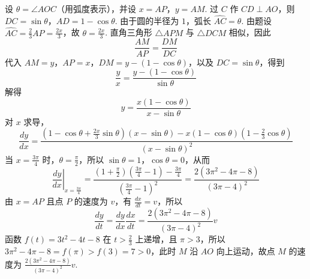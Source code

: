 \begin{solution}
设 \(\theta=\angle AOC\)（用弧度表示），并设 \(x=AP\)，\(y=AM\). 过 \(C\) 作 \(CD\perp AO\)，则 \(DC=\sin\theta\)，\(AD=1-\cos\theta\).
由于圆的半径为 \(1\)，弧长 \(\widehat{AC}=\theta\). 由题设 \(\widehat{AC}=\frac{2}{3}AP=\frac{2x}{3}\)，故 \(\theta=\frac{2x}{3}\).
直角三角形 \(\triangle APM\) 与 \(\triangle DCM\) 相似，因此
\[
\frac{AM}{AP}=\frac{DM}{DC}
\]
代入 \(AM=y\)，\(AP=x\)，\(DM=y-(1-\cos\theta)\)，以及 \(DC=\sin\theta\)，得到
\[
\frac{y}{x}=\frac{y-(1-\cos\theta)}{\sin\theta}
\]
解得
\[
y=\frac{x(1-\cos\theta)}{x-\sin\theta}
\]
对 \(x\) 求导，
\[
\frac{dy}{dx}=\frac{\left(1-\cos\theta+\frac{2x}{3}\sin\theta\right)(x-\sin\theta)-x(1-\cos\theta)\left(1-\frac{2}{3}\cos\theta\right)}{(x-\sin\theta)^2}
\]
当 \(x=\frac{3\pi}{4}\) 时，\(\theta=\frac\pi2\)，所以 \(\sin\theta=1\)，\(\cos\theta=0\)，从而
\[
\left.\frac{dy}{dx}\right|_{x=\frac{3\pi}{4}}=\frac{\left(1+\frac\pi2\right)\left(\frac{3\pi}{4}-1\right)-\frac{3\pi}{4}}{\left(\frac{3\pi}{4}-1\right)^2}=\frac{2(3\pi^2-4\pi-8)}{(3\pi-4)^2}
\]
由 \(x=AP\) 且点 \(P\) 的速度为 \(v\)，有 \(\frac{dx}{dt}=v\)，所以
\[
\frac{dy}{dt}=\frac{dy}{dx}\frac{dx}{dt}=\frac{2(3\pi^2-4\pi-8)}{(3\pi-4)^2}v
\]
函数 \(f(t)=3t^2-4t-8\) 在 \(t>\frac23\) 上递增，且 \(\pi>3\)，所以 \(3\pi^2-4\pi-8=f(\pi)>f(3)=7>0\)，此时 \(M\) 沿 \(AO\) 向上运动，故点 \(M\) 的速度为 \(\frac{2(3\pi^2-4\pi-8)}{(3\pi-4)^2}v\).
\end{solution}
